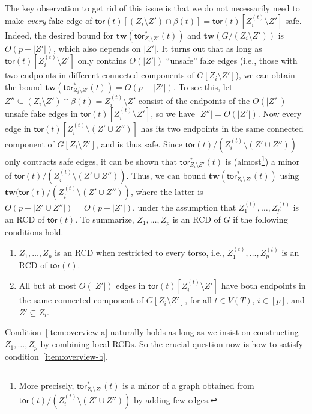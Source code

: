 \documentclass[a4paper,11pt]{article}
\numberwithin{lemma}{section}
\newcommand{\tw}{\mathbf{tw}}
\newcommand{\tor}{\mathsf{tor}}
\begin{document}
The key observation to get rid of this issue is that we do not necessarily need to make \emph{every} fake edge of $\tor(t)[(Z_i \setminus Z') \cap \beta(t)] = \tor(t)[Z_i^{(t)} \setminus Z']$ safe.
Indeed, the desired bound for $\tw(\tor_{Z_i \setminus Z'}^*(t))$ and $\tw(G/(Z_i \setminus Z'))$ is $O(p+|Z'|)$, which also depends on $|Z'|$.
It turns out that as long as $\tor(t)[Z_i^{(t)} \setminus Z']$ only contains $O(|Z'|)$ ``unsafe'' fake edges (i.e., those with two endpoints in different connected components of $G[Z_i \setminus Z']$), we can obtain the bound $\tw(\tor_{Z_i \setminus Z'}^*(t)) = O(p+|Z'|)$.
To see this, let $Z'' \subseteq (Z_i \setminus Z') \cap \beta(t) = Z_i^{(t)} \setminus Z'$ consist of the endpoints of the $O(|Z'|)$ unsafe fake edges in $\tor(t)[Z_i^{(t)} \setminus Z']$, so we have $|Z''| = O(|Z'|)$.
Now every edge in $\tor(t)[Z_i^{(t)} \setminus (Z' \cup Z'')]$ has its two endpoints in the same connected component of $G[Z_i \setminus Z']$, and is thus safe.
Since $\tor(t)/(Z_i^{(t)} \setminus (Z' \cup Z''))$ only contracts safe edges, it can be shown that $\tor_{Z_i \setminus Z'}^*(t)$ is (almost\footnote{More precisely, $\tor_{Z_i \setminus Z'}^*(t)$ is a minor of a graph obtained from $\tor(t)/(Z_i^{(t)} \setminus (Z' \cup Z''))$ by adding few edges.}) a minor of $\tor(t)/(Z_i^{(t)} \setminus (Z' \cup Z''))$.
Thus, we can bound $\tw(\tor_{Z_i \setminus Z'}^*(t))$ using $\tw(\tor(t)/(Z_i^{(t)} \setminus (Z' \cup Z''))$, where the latter is $O(p+|Z' \cup Z''|) = O(p+|Z'|)$, under the assumption that $Z_1^{(t)},\dots,Z_p^{(t)}$ is an RCD of $\tor(t)$.
To summarize, $Z_1,\dots,Z_p$ is an RCD of $G$ if the following conditions hold.
\begin{enumerate}[label = (\Alph*)]
 \item\label{item:overview-a} $Z_1,\dots,Z_p$ is an RCD when restricted to every torso, i.e., $Z_1^{(t)},\dots,Z_p^{(t)}$ is an RCD of $\tor(t)$.
 \item\label{item:overview-b} All but at most $O(|Z'|)$ edges in $\tor(t)[Z_i^{(t)} \setminus Z']$ have both endpoints in the same connected component of $G[Z_i \setminus Z']$, for all $t \in V(T)$, $i \in [p]$, and $Z' \subseteq Z_i$.
\end{enumerate}
Condition~\ref{item:overview-a} naturally holds as long as we insist on constructing $Z_1,\dots,Z_p$ by combining local RCDs.
So the crucial question now is how to satisfy condition~\ref{item:overview-b}.
\end{document}
